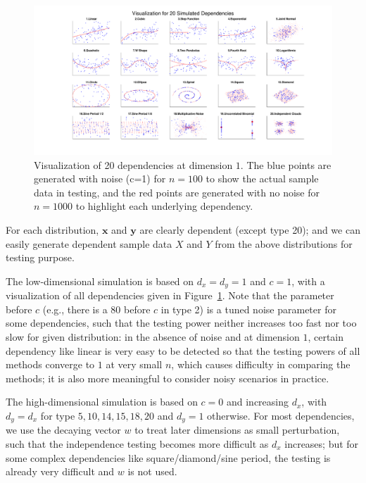 \documentclass[11pt]{article}
\providecommand{\mb}[1]{\boldsymbol{#1}}
\begin{document}
\begin{figure}[htbp]
\includegraphics[trim={5cm 0 3.5cm 0},clip, width=1.0\textwidth]{../Figures/Fig0}
\caption{Visualization of 20 dependencies at dimension $1$. The blue points are generated with noise (c=1) for $n=100$ to show the actual sample data in testing, and the red points are generated with no noise for $n=1000$ to highlight each underlying dependency.
}
\label{fig0}
\end{figure}

For each distribution, $\mb{x}$ and $\mb{y}$ are clearly dependent (except type 20); and we can easily generate dependent sample data $X$ and $Y$ from the above distributions for testing purpose.

The low-dimensional simulation is based on $d_{x}=d_{y}=1$ and $c=1$, with a visualization of all dependencies given in Figure~\ref{fig0}. Note that the parameter before $c$ (e.g., there is a $80$ before $c$ in type 2) is a tuned noise parameter for some dependencies, such that the testing power neither increases too fast nor too slow for given distribution: in the absence of noise and at dimension $1$, certain dependency like linear is very easy to be detected so that the testing powers of all methods converge to $1$ at very small $n$, which causes difficulty in comparing the methods; it is also more meaningful to consider noisy scenarios in practice. 

The high-dimensional simulation is based on $c=0$ and increasing $d_{x}$, with $d_{y}=d_{x}$ for type $5,10,14,15,18,20$ and $d_{y}=1$ otherwise. For most dependencies, we use the decaying vector $w$ to treat later dimensions as small perturbation, such that the independence testing becomes more difficult as $d_{x}$ increases; but for some complex dependencies like square/diamond/sine period, the testing is already very difficult and $w$ is not used.
\end{document}

